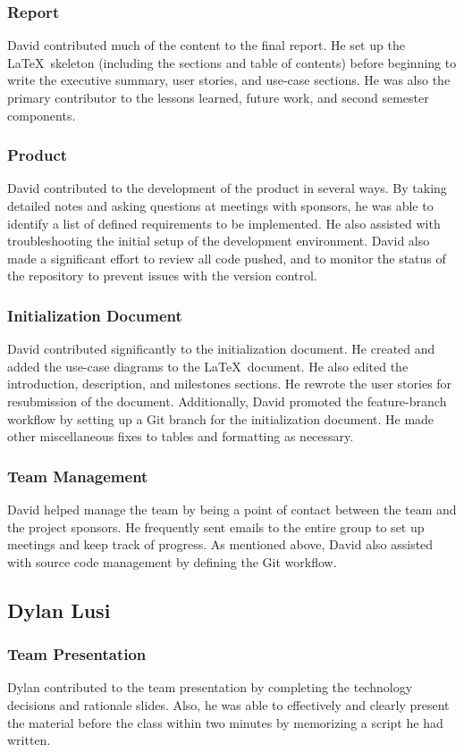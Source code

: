 \documentclass[12pt]{article}
\begin{document}
\begin{spacing}{1.5}
\subsubsection{Report}
David contributed much of the content to the final report. He set up the \LaTeX\ skeleton (including the sections and table of contents) before beginning to write the executive summary, user stories, and use-case sections. He was also the primary contributor to the lessons learned, future work, and second semester components.
\subsubsection{Product}
David contributed to the development of the product in several ways. By taking detailed notes and asking questions at meetings with sponsors, he was able to identify a list of defined requirements to be implemented. He also assisted with troubleshooting the initial setup of the development environment. David also made a significant effort to review all code pushed, and to monitor the status of the repository to prevent issues with the version control.
\subsubsection{Initialization Document}
David contributed significantly to the initialization document. He created and added the use-case diagrams to the \LaTeX\ document. He also edited the introduction, description, and milestones sections. He rewrote the user stories for resubmission of the document. Additionally, David promoted the feature-branch workflow by setting up a Git branch for the initialization document. He made other miscellaneous fixes to tables and formatting as necessary.
\subsubsection{Team Management}
David helped manage the team by being a point of contact between the team and the project sponsors. He frequently sent emails to the entire group to set up meetings and keep track of progress. As mentioned above, David also assisted with source code management by defining the Git workflow.

\clearpage

\subsection{Dylan Lusi}
\subsubsection{Team Presentation}
Dylan contributed to the team presentation by completing the technology decisions and rationale slides.  Also, he was able to effectively and clearly present the material before the class within two minutes by memorizing a script he had written.

\end{spacing}
\end{document}

